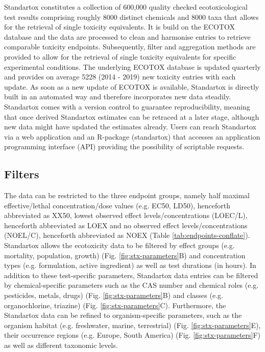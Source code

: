 \documentclass[journal,datadescriptor,accept,moreauthors,pdftex]{Definitions/mdpi}
\begin{document}
Standartox constitutes a collection of 600,000 quality checked ecotoxicological test results comprising roughly 8000 distinct chemicals and 8000 taxa that allows for the retrieval of single toxicity equivalents. It is build on the ECOTOX database \citep{usepa_ecotox_2019} and the data are processed to clean and harmonise entries to retrieve comparable toxicity endpoints. Subsequently, filter and aggregation methods are provided to allow for the retrieval of single toxicity equivalents for specific experimental conditions. The underlying ECOTOX database is updated quarterly and provides on average 5228 (2014 - 2019) new toxicity entries with each update. As soon as a new update of ECOTOX is available, Standartox is directly built in an automated way and therefore incorporates new data steadily. Standartox comes with a version control to guarantee reproducibility, meaning that once derived Standartox estimates can be retraced at a later stage, although new data might have updated the estimates already. Users can reach Standartox via a web application and an R-package (standartox) that accesses an application programming interface (API) providing the possibility of scriptable requests.

\subsection{Filters}
The data can be restricted to the three endpoint groups, namely half maximal effective/lethal concentration/dose values (e.g. EC50, LD50), henceforth abbreviated as XX50, lowest observed effect levels/concentrations (LOEC/L), henceforth abbreviated as LOEX and no observed effect levels/concentrations (NOEL/C), henceforth abbreviated as NOEX (Table \ref{tab:endpoints-conflate}). Standartox allows the ecotoxicity data to be filtered by effect groups (e.g. mortality, population, growth) (Fig. \ref{fig:stx-parameters}B) and concentration types (e.g. formulation, active ingredient) as well as test durations (in hours). In addition to these test-specific parameters, Standartox data entries can be filtered by chemical-specific parameters such as the CAS number and chemical roles (e.g. pesticides, metals, drugs) (Fig. \ref{fig:stx-parameters}B) and classes (e.g. organochlorine, triazine) (Fig. \ref{fig:stx-parameters}C). Furthermore, the Standartox data can be refined to organism-specific parameters, such as the organism habitat (e.g. freshwater, marine, terrestrial) (Fig. \ref{fig:stx-parameters}E), their occurrence regions (e.g. Europe, South America) (Fig. \ref{fig:stx-parameters}F) as well as different taxonomic levels.
\end{document}
